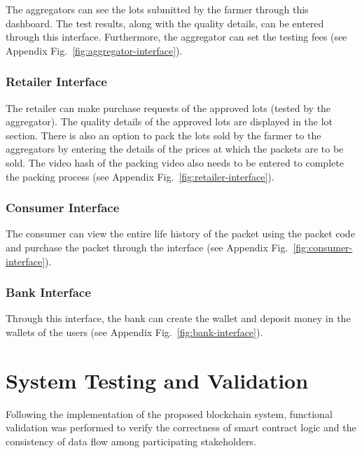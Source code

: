 \documentclass[12pt]{article}
\begin{document}
	The aggregators can see the lots submitted by the farmer through this dashboard. The test results, along with the quality details, can be entered through this interface. Furthermore, the aggregator can set the testing fees (see Appendix Fig.~\ref{fig:aggregator-interface}).
	
	\subsubsection{Retailer Interface}
	
	The retailer can make purchase requests of the approved lots (tested by the aggregator). The quality details of the approved lots are displayed in the lot section. There is also an option to pack the lots sold by the farmer to the aggregators by entering the details of the prices at which the packets are to be sold. The video hash of the packing video also needs to be entered to complete the packing process (see Appendix Fig.~\ref{fig:retailer-interface}).
	
	
	
	
	
	\subsubsection{Consumer Interface}
	
	The consumer can view the entire life history of the packet using the packet code and purchase the packet through the interface (see Appendix Fig.~\ref{fig:consumer-interface}).
	
	
	
	\subsubsection{Bank Interface}
	
	
	
	Through this interface, the bank can create the wallet and deposit money in the wallets of the users (see Appendix Fig.~\ref{fig:bank-interface}).
	
	
	
	
	\section{System Testing and Validation}
	
	Following the implementation of the proposed blockchain system, functional validation was performed to verify the correctness of smart contract logic and the consistency of data flow among participating stakeholders.
	
\end{document}
